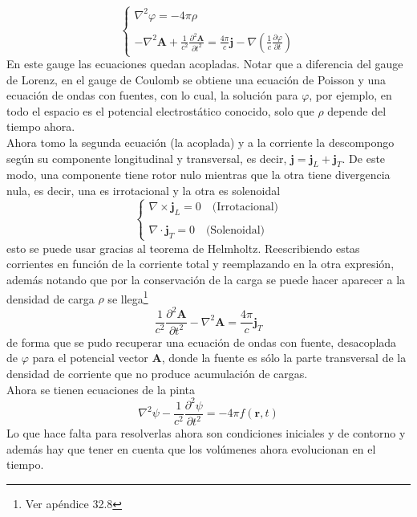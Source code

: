 \begin{equation*}
    \left\{
        \begin{matrix}
            \nabla^{2}\varphi = -4\pi\rho \\
            \\
            -\nabla^{2}\textbf{A} 
            + \frac{1}{c^{2}}\frac{\partial^{2}\textbf{A}}{\partial t^{2}} = \frac{4\pi}{c}\textbf{j} 
            -\nabla 
            \left(
                \frac{1}{c}\frac{\partial \varphi}{\partial t}
            \right)
        \end{matrix}
    \right.
\end{equation*}
En este gauge las ecuaciones quedan acopladas. Notar que a diferencia del gauge de Lorenz, en el gauge de Coulomb se obtiene una ecuación de Poisson y una ecuación de ondas con fuentes, con lo cual, la solución para $\varphi$, por ejemplo, en todo el espacio es el potencial electrostático conocido, solo que $\rho$ depende del tiempo ahora.\\
\indent Ahora tomo la segunda ecuación (la acoplada) y a la corriente la descompongo según su componente longitudinal y transversal, es decir, $\textbf{j} = \textbf{j}_{L} + \textbf{j}_{T}$. De este modo, una componente tiene rotor nulo mientras que la otra tiene divergencia nula, es decir, una es irrotacional y la otra es solenoidal
\begin{equation*}
    \left\{
        \begin{matrix}
            \nabla \times \textbf{j}_{L} = 0\quad \mbox{(Irrotacional)}\\
            \\
            \nabla \cdot \textbf{j}_{T} = 0\quad
            \mbox{(Solenoidal)}
        \end{matrix}
    \right.
\end{equation*}
esto se puede usar gracias al teorema de Helmholtz. Reescribiendo estas corrientes en función de la corriente total y reemplazando en la otra expresión, además notando que por la conservación de la carga se puede hacer aparecer a la densidad de carga $\rho$ se llega\footnote{Ver apéndice 32.8}
\begin{equation*}
    \frac{1}{c^{2}}\frac{\partial^{2}\textbf{A}}{\partial t^{2}} - \nabla^{2}\textbf{A} = 
    \frac{4\pi}{c}\textbf{j}_{T}
\end{equation*}
de forma que se pudo recuperar una ecuación de ondas con fuente, desacoplada de $\varphi$ para el potencial vector $\textbf{A}$, donde la fuente es sólo la parte transversal de la densidad de corriente que no produce acumulación de cargas.\\
\indent Ahora se tienen ecuaciones de la pinta 
\begin{equation}
    \nabla^{2}\psi- \frac{1}{c^{2}}\frac{\partial^{2}\psi}{\partial t^{2}} = -4\pi f(\textbf{r},t)
        \label{ec:MaxwellEcsGaugeLorenz}
\end{equation}
Lo que hace falta para resolverlas ahora son condiciones iniciales y de contorno y además hay que tener en cuenta que los volúmenes ahora evolucionan en el tiempo.

